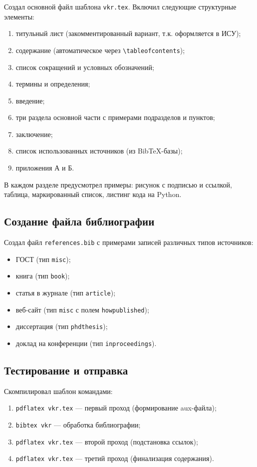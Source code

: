 \documentclass[a4paper,14pt]{extarticle}
\begin{document}
Создал основной файл шаблона \texttt{vkr.tex}. Включил следующие структурные элементы:
\begin{enumerate}
  \item титульный лист (закомментированный вариант, т.к. оформляется в ИСУ);
  \item содержание (автоматическое через \texttt{\textbackslash tableofcontents});
  \item список сокращений и условных обозначений;
  \item термины и определения;
  \item введение;
  \item три раздела основной части с примерами подразделов и пунктов;
  \item заключение;
  \item список использованных источников (из BibTeX-базы);
  \item приложения А и Б.
\end{enumerate}

В каждом разделе предусмотрел примеры: рисунок с подписью и ссылкой, таблица, маркированный список, листинг кода на Python.

\subsection{Создание файла библиографии}

Создал файл \texttt{references.bib} с примерами записей различных типов источников:
\begin{itemize}
  \item ГОСТ (тип \texttt{misc});
  \item книга (тип \texttt{book});
  \item статья в журнале (тип \texttt{article});
  \item веб-сайт (тип \texttt{misc} с полем \texttt{howpublished});
  \item диссертация (тип \texttt{phdthesis});
  \item доклад на конференции (тип \texttt{inproceedings}).
\end{itemize}

\subsection{Тестирование и отправка}

Скомпилировал шаблон командами:
\begin{enumerate}
  \item \texttt{pdflatex vkr.tex} --- первый проход (формирование aux-файла);
  \item \texttt{bibtex vkr} --- обработка библиографии;
  \item \texttt{pdflatex vkr.tex} --- второй проход (подстановка ссылок);
  \item \texttt{pdflatex vkr.tex} --- третий проход (финализация содержания).
\end{enumerate}
\end{document}
